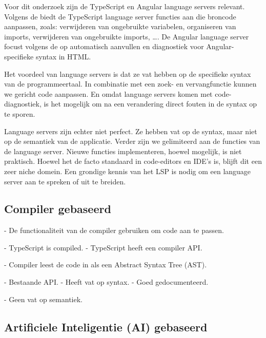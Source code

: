 Voor dit onderzoek zijn de TypeScript en Angular language servers relevant.
Volgens de \textcite{TypeScriptLS2025} biedt de TypeScript language server functies aan die broncode aanpassen, zoals: verwijderen van ongebruikte variabelen, organiseren van imports, verwijderen van ongebruikte imports, \dots.
De Angular language server focust volgens de \textcite{AngularLS2025} op automatisch aanvullen en diagnostiek voor Angular-specifieke syntax in HTML.

Het voordeel van language servers is dat ze vat hebben op de specifieke syntax van de programmeertaal.
In combinatie met een zoek- en vervangfunctie kunnen we gericht code aanpassen.
En omdat language servers komen met code-diagnostiek, is het mogelijk om na een verandering direct fouten in de syntax op te sporen.

Language servers zijn echter niet perfect.
Ze hebben vat op de syntax, maar niet op de semantiek van de applicatie.
Verder zijn we gelimiteerd aan de functies van de language server.
Nieuwe functies implementeren, hoewel mogelijk, is niet praktisch.
Hoewel het de facto standaard in code-editors en IDE's is, blijft dit een zeer niche domein.
Een grondige kennis van het LSP is nodig om een language server aan te spreken of uit te breiden.

\subsection{Compiler gebaseerd}
\label{ch:stand-van-zaken:refactoring:compiler}


- De functionaliteit van de compiler gebruiken om code aan te passen.


- TypeScript is compiled.
- TypeScript heeft een compiler API.


- Compiler leest de code in als een Abstract Syntax Tree (AST).


- Bestaande API.
- Heeft vat op syntax.
- Goed gedocumenteerd.


- Geen vat op semantiek.

\subsection{Artificiele Inteligentie (AI) gebaseerd}
\label{ch:stand-van-zaken:refactoring:ai}

